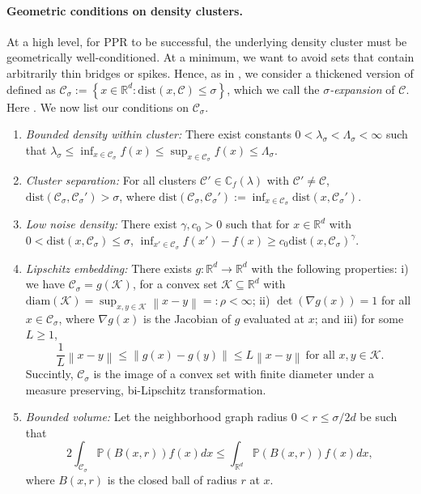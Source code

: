 \documentclass{article}
\newcommand{\diam}{\rho}
\newcommand{\set}[1]{\left\{#1\right\}}
\newcommand{\Reals}{\mathbb{R}}
\newcommand{\Rd}{\Reals^d}
\newcommand{\norm}[1]{\left\lVert#1\right\rVert}
\newcommand{\1}{\mathbf{1}}
\newcommand{\dist}{\mathrm{dist}}
\newcommand{\Pbb}{\mathbb{P}}
\newcommand{\Cbb}{\mathbb{C}}
\newcommand{\Cset}{\mathcal{C}}
\newcommand{\Csig}{\Cset_{\sigma}}
\theoremstyle{aldenthm}
\theoremstyle{aldenrmrk}
\begin{document}
\paragraph{Geometric conditions on density clusters.} At a high level, for PPR
to be successful, the underlying density cluster must be geometrically
well-conditioned.  At a minimum, we want to avoid sets that contain arbitrarily
thin bridges or spikes.  Hence, as in \cite{chaudhuri2010}, we consider a
thickened version of \smash{$\Cset \in \Cbb_f(\lambda)$} defined as 
$\Csig := \set{x \in \Reals^d: \dist(x,\Cset) \leq \sigma}$, which 
we call the \emph{$\sigma$-expansion} of $\Cset$. Here 
\smash{$\dist(x,\Cset) := \inf_{y \in \Cset} \norm{y - x}$}.  We now list our
conditions on $\Csig$.

\begin{enumerate}[label=(A\arabic*)]
\item
  \label{asmp: bounded_density}
  \emph{Bounded density within cluster:} There exist constants
  $0<\lambda_{\sigma}< \Lambda_{\sigma}<\infty$ such that 
  $\lambda_{\sigma} \leq \inf_{x \in \Csig} f(x) \leq \sup_{x \in \Csig} f(x)
  \leq \Lambda_{\sigma}$. 
  
\item
  \label{asmp: cluster_separation}
  \emph{Cluster separation:}
  For all clusters $\Cset' \in \Cbb_f(\lambda)$ with $\Cset' \not= \Cset$, 
  $\dist(\Csig,\Csig') > \sigma$, where $\dist(\Csig,\Csig') := \inf_{x
    \in \Csig} \dist(x,\Csig')$.  
    
\item 
  \label{asmp: low_noise_density}
  \emph{Low noise density:} There exist $\gamma,c_0 > 0$ such that for 
  $x \in \Rd$ with $0 < \dist(x, \Csig) \leq \sigma$,   
  $\inf_{x' \in \Csig} f(x') - f(x) \geq  c_0 \dist(x, \Csig)^{\gamma}$.
	
\item
  \label{asmp: embedding}
  \emph{Lipschitz embedding:}
  There exists $g: \Reals^d \to \Reals^d$ with the following properties: i)
  we have $\Csig = g(\mathcal{K})$, for a convex set $\mathcal{K} \subseteq \Rd$
  with $\mathrm{diam}(\mathcal{K}) = \sup_{x,y \in \mathcal{K}}\norm{x - y} =:
  \diam < \infty$; ii) $\det(\nabla g (x)) = 1$ for all $x \in \Csig$, where
  $\nabla g(x)$ is the Jacobian of $g$ evaluated at $x$; and iii) for some $L
  \geq 1$,   
  \begin{equation*}
    \frac{1}{L}\norm{x - y} \leq \norm{g(x) - g(y)} \leq L \norm{x - y} ~
    \text{for all $x,y \in \mathcal{K}$}. 
  \end{equation*}
  Succintly, $\Csig$ is the image of a convex set with finite diameter 
  under a  measure preserving, bi-Lipschitz transformation. 

\item
  \label{asmp: bounded_volume}
  \emph{Bounded volume:}
  Let the neighborhood graph radius $0 < r \leq \sigma/2d$ be such that
  \begin{equation*}
    2 \int_{\Csig} \Pbb(B(x,r)) f(x) dx \leq \int_{\Rd} \Pbb(B(x,r)) f(x) dx,
  \end{equation*}
  where $B(x,r)$ is the closed ball of radius $r$ at $x$.
\end{enumerate}
\end{document}
